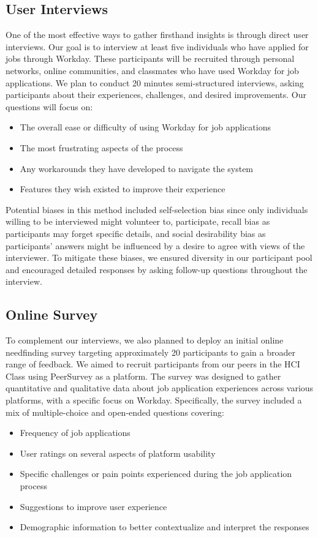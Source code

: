 \documentclass[
	letterpaper, %
]{jdf}
\begin{document}
\begin{sloppypar}
\subsection {User Interviews}
One of the most effective ways to gather firsthand insights is through direct user interviews. Our goal is to interview at least five individuals who have applied for jobs through Workday. These participants will be recruited through personal networks, online communities, and classmates who have used Workday for job applications. We plan to conduct 20 minutes semi-structured interviews, asking participants about their experiences, challenges, and desired improvements. Our questions will focus on:
\begin{itemize}
    \item The overall ease or difficulty of using Workday for job applications
    \item The most frustrating aspects of the process
    \item Any workarounds they have developed to navigate the system
    \item Features they wish existed to improve their experience
\end{itemize}

Potential biases in this method included self-selection bias since only individuals willing to be interviewed might volunteer to, participate, recall bias as participants may forget specific details, and social desirability bias as participants’ answers might be influenced by a desire to agree with views of the interviewer. To mitigate these biases, we ensured diversity in our participant pool and encouraged detailed responses by asking follow-up questions throughout the interview. 
\hfill \break

\subsection {Online Survey}
To complement our interviews, we also planned to deploy an initial online needfinding survey targeting approximately 20 participants to gain a broader range of feedback. We aimed to recruit participants from our peers in the HCI Class using PeerSurvey as a platform. The survey was designed to  gather quantitative and qualitative data about job application experiences across various platforms, with a specific focus on Workday. Specifically, the survey included a mix of multiple-choice and open-ended questions covering:
\begin{itemize}
    \item Frequency of job applications
    \item User ratings on several aspects of platform usability
    \item Specific challenges or pain points experienced during the  job application process
    \item Suggestions to improve user experience
    \item Demographic information to better contextualize and interpret the responses
\end{itemize}


\end{sloppypar}
\end{document}
